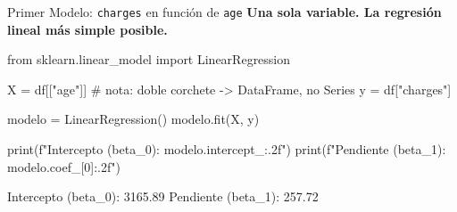 \documentclass[aspectratio=169, 11pt]{beamer}
\begin{document}
\begin{frame}[fragile,shrink=28]{Primer Modelo: \texttt{charges} en función de \texttt{age}}
  \vspace{-6pt}
  {\footnotesize\color{arcaDark}\bfseries
    Una sola variable. La regresión lineal más simple posible.}

  \vspace{4pt}
  \begin{pyblock}
from sklearn.linear_model import LinearRegression

X = df[["age"]]      # nota: doble corchete -> DataFrame, no Series
y = df["charges"]

modelo = LinearRegression()
modelo.fit(X, y)

print(f"Intercepto (beta_0): {modelo.intercept_:.2f}")
print(f"Pendiente  (beta_1): {modelo.coef_[0]:.2f}")
  \end{pyblock}

  \vspace{4pt}
  \begin{outputblock}
Intercepto (beta_0): 3165.89
Pendiente  (beta_1): 257.72
  \end{outputblock}
\end{frame}
\end{document}
